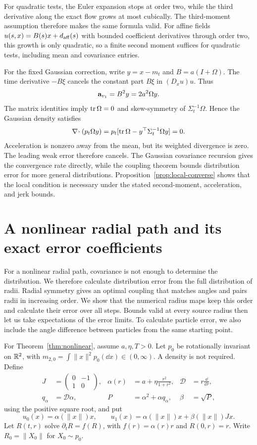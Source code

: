For quadratic tests, the Euler expansion stops at order two, while the third derivative along the exact flow grows at most cubically. The third-moment assumption therefore makes the same formula valid. For affine fields $u(s,x)=B(s)x+d_{\rm aff}(s)$ with bounded coefficient derivatives through order two, this growth is only quadratic, so a finite second moment suffices for quadratic tests, including mean and covariance entries.

For the fixed Gaussian correction, write $y=x-m_t$ and $B=a(I+\Omega)$. The time derivative $-B\xi$ cancels the constant part $B\xi$ in $(D_xu)u$. Thus
\[
 \mathbf a_{v_1}=B^2y=2a^2\Omega y.
\]
The matrix identities imply $\operatorname{tr} \Omega=0$ and skew-symmetry of $\Sigma_t^{-1}\Omega$. Hence the Gaussian density satisfies
\[
 \nabla\!\cdot(p_t\Omega y)
 =p_t[\operatorname{tr} \Omega-y^\top\Sigma_t^{-1}\Omega y]=0.
\]
Acceleration is nonzero away from the mean, but its weighted divergence is zero. The leading weak error therefore cancels. The Gaussian covariance recursion gives the convergence rate directly, while the coupling theorem bounds distribution error for more general distributions. Proposition~\ref{prop:local-converse} shows that the local condition is necessary under the stated second-moment, acceleration, and jerk bounds.

\section{A nonlinear radial path and its exact error coefficients}
\label{app:nonlinear}

For a nonlinear radial path, covariance is not enough to determine the distribution. We therefore calculate distribution error from the full distribution of radii. Radial symmetry gives an optimal coupling that matches angles and pairs radii in increasing order. We show that the numerical radius maps keep this order and calculate their error over all steps. Bounds valid at every source radius then let us take expectations of the error limits. To calculate particle error, we also include the angle difference between particles from the same starting point.

For Theorem~\ref{thm:nonlinear}, assume $a,\eta,T>0$. Let $p_0$ be rotationally invariant on $\mathbb R^2$, with $m_{2,0}=\int \|x\|^2p_0(\dd x)\in(0,\infty)$. A density is not required. Define
\begin{align*}
 J&=\begin{pmatrix}0&-1\\1&0\end{pmatrix},&
 \alpha(r)&=a+\eta\frac{r^2}{1+r^2},& \mathcal D &=r\frac{\dd}{\dd r},\\
 q_\alpha&=\mathcal D \alpha,&P&=\alpha^2+\alpha q_\alpha,&\beta&=\sqrt P,
\end{align*}
using the positive square root, and put
\begin{equation}
 u_0(x)=\alpha(\|x\|)x,\qquad u_1(x)=\alpha(\|x\|)x+\beta(\|x\|)Jx.
 \label{eq:nonlinear-fields-full}
\end{equation}
Let $R(t,r)$ solve $\partial_tR=f(R)$, with $f(r)=\alpha(r)r$ and $R(0,r)=r$. Write $R_0=\|X_0\|$ for $X_0\sim p_0$.

